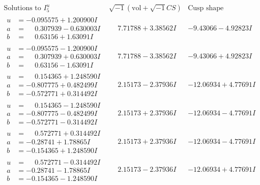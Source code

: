 \documentclass[1p]{elsarticle_modified}
\theoremstyle{definition}
\newcommand{\I}{\sqrt{-1}}
\begin{document}
$$\begin{array}{c|c|c}  
\text{Solutions to }I^u_{5}& \I (\text{vol} + \sqrt{-1}CS) & \text{Cusp shape}\\
 \hline 
\begin{aligned}
u &= -0.095575 + 1.200900 I \\
a &= \phantom{-}0.307939 - 0.630003 I \\
b &= \phantom{-}0.63156 + 1.63091 I\end{aligned}
 & \phantom{-}7.71788 + 3.38562 I & -9.43066 - 4.92823 I \\ \hline\begin{aligned}
u &= -0.095575 - 1.200900 I \\
a &= \phantom{-}0.307939 + 0.630003 I \\
b &= \phantom{-}0.63156 - 1.63091 I\end{aligned}
 & \phantom{-}7.71788 - 3.38562 I & -9.43066 + 4.92823 I \\ \hline\begin{aligned}
u &= \phantom{-}0.154365 + 1.248590 I \\
a &= -0.807775 + 0.482499 I \\
b &= -0.572771 + 0.314492 I\end{aligned}
 & \phantom{-}2.15173 - 2.37936 I & -12.06934 + 4.77691 I \\ \hline\begin{aligned}
u &= \phantom{-}0.154365 - 1.248590 I \\
a &= -0.807775 - 0.482499 I \\
b &= -0.572771 - 0.314492 I\end{aligned}
 & \phantom{-}2.15173 + 2.37936 I & -12.06934 - 4.77691 I \\ \hline\begin{aligned}
u &= \phantom{-}0.572771 + 0.314492 I \\
a &= -0.28741 + 1.78865 I \\
b &= -0.154365 + 1.248590 I\end{aligned}
 & \phantom{-}2.15173 + 2.37936 I & -12.06934 - 4.77691 I \\ \hline\begin{aligned}
u &= \phantom{-}0.572771 - 0.314492 I \\
a &= -0.28741 - 1.78865 I \\
b &= -0.154365 - 1.248590 I\end{aligned}
 & \phantom{-}2.15173 - 2.37936 I & -12.06934 + 4.77691 I \\ \hline\begin{aligned}

\end{aligned}
\end{array}$$
\end{document}
